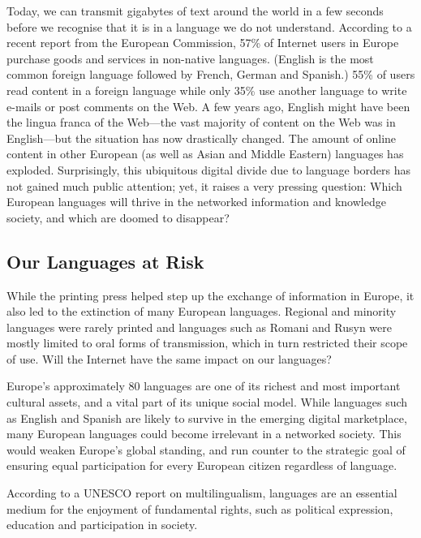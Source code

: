 \begin{multicols}{2}
Today, we can transmit gigabytes of text around the world in a few seconds before we recognise that it is in a language we do not understand. According to a recent report from the European Commission, 57\% of Internet users in Europe purchase goods and services in non-native languages. (English is the most common foreign language followed by French, German and Spanish.) 55\% of users read content in a foreign language while only 35\% use another language to write e-mails or post comments on the Web\cite{EC1}. A few years ago, English might have been the lingua franca of the Web—the vast majority of content on the Web was in English—but the situation has now drastically changed. The amount of online content in other European (as well as Asian and Middle Eastern) languages has exploded.
Surprisingly, this ubiquitous digital divide due to language borders has not gained much public attention; yet, it raises a very pressing question: Which European languages will thrive in the networked information and knowledge society, and which are doomed to disappear?

\subsection{Our Languages at Risk}
While the printing press helped step up the exchange of information in Europe, it also led to the extinction of many European languages. Regional and minority languages were rarely printed and languages such as Romani and Rusyn were mostly limited to oral forms of transmission, which in turn restricted their scope of use. Will the Internet have the same impact on our languages?
 
Europe’s approximately 80 languages are one of its richest and most important cultural assets, and a vital part of its unique social model\cite{EC2}. While languages such as English and Spanish are likely to survive in the emerging digital marketplace, many European languages could become irrelevant in a networked society. This would weaken Europe’s global standing, and run counter to the strategic goal of ensuring equal participation for every European citizen regardless of language. 

According to a UNESCO report on multilingualism, languages are an essential medium for the enjoyment of fundamental rights, such as political expression, education and participation in society\cite{Unesco1}.



\end{multicols}
